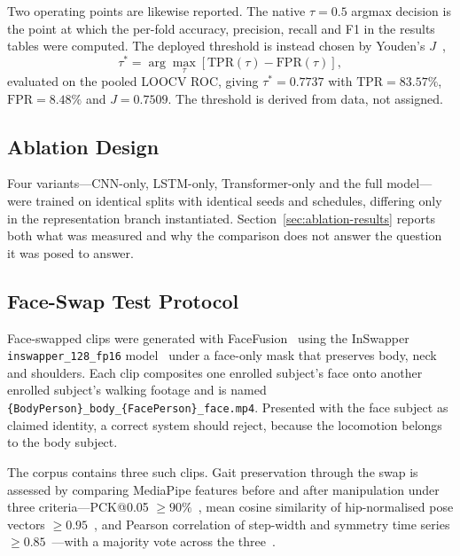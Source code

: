 \documentclass[journal]{IEEEtran}
\begin{document}
Two operating points are likewise reported. The native $\tau = 0.5$ argmax
decision is the point at which the per-fold accuracy, precision, recall and F1
in the results tables were computed. The deployed threshold is instead chosen by
Youden's $J$~\cite{youden,fluss},
\begin{equation}
\tau^* = \arg\max_\tau\left[\mathrm{TPR}(\tau) - \mathrm{FPR}(\tau)\right],
\end{equation}
evaluated on the pooled LOOCV ROC, giving $\tau^* = 0.7737$ with
$\mathrm{TPR} = 83.57\%$, $\mathrm{FPR} = 8.48\%$ and $J = 0.7509$. The
threshold is derived from data, not assigned.

\subsection{Ablation Design}

Four variants---CNN-only, LSTM-only, Transformer-only and the full model---were
trained on identical splits with identical seeds and schedules, differing only
in the representation branch instantiated. Section~\ref{sec:ablation-results}
reports both what was measured and why the comparison does not answer the
question it was posed to answer.

\subsection{Face-Swap Test Protocol}

Face-swapped clips were generated with FaceFusion~\cite{facefusion} using the
InSwapper \texttt{inswapper\_128\_fp16} model~\cite{insightface} under a
face-only mask that preserves body, neck and shoulders. Each clip composites
one enrolled subject's face onto another enrolled subject's walking footage and
is named
\texttt{\{BodyPerson\}\_body\_\{FacePerson\}\_face.mp4}. Presented with the
face subject as claimed identity, a correct system should reject, because the
locomotion belongs to the body subject.

The corpus contains three such clips. Gait preservation through the swap is
assessed by comparing MediaPipe features before and after manipulation under
three criteria---PCK@0.05 $\ge 90\%$~\cite{andriluka_mpii}, mean cosine
similarity of hip-normalised pose vectors $\ge 0.95$~\cite{liao_gait}, and
Pearson correlation of step-width and symmetry time series $\ge
0.85$~\cite{menz}---with a majority vote across the three~\cite{taha_metrics}.

\end{document}
